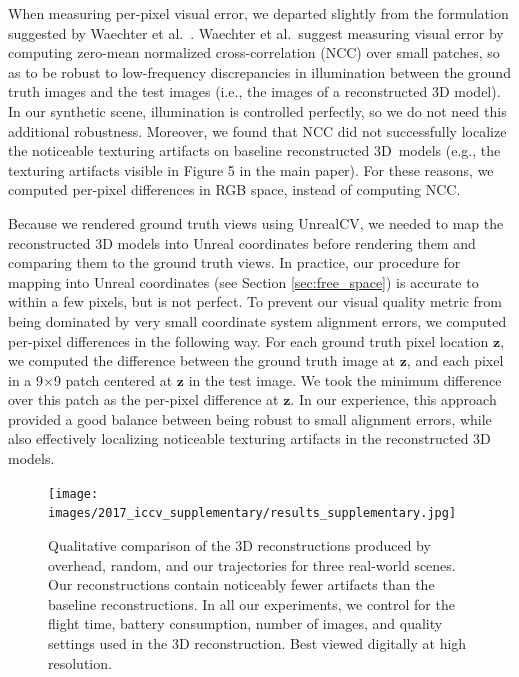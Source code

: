 When measuring per-pixel visual error, we departed slightly from the formulation suggested by Waechter et al.~\cite{waechter:2017}.
Waechter et al.~suggest measuring visual error by computing zero-mean normalized cross-correlation (NCC) over small patches, so as to be robust to low-frequency discrepancies in illumination between the ground truth images and the test images (i.e., the images of a reconstructed 3D model).
In our synthetic scene, illumination is controlled perfectly, so we do not need this additional robustness.
Moreover, we found that NCC did not successfully localize the noticeable texturing artifacts on baseline reconstructed 3D\ models (e.g., the texturing artifacts visible in Figure 5 in the main paper).
For these reasons, we computed per-pixel differences in RGB space, instead of computing NCC.

Because we rendered ground truth views using UnrealCV, we needed to map the reconstructed 3D models into Unreal coordinates before rendering them and comparing them to the ground truth views.
In practice, our procedure for mapping into Unreal coordinates (see Section \ref{sec:free_space}) is accurate to within a few pixels, but is not perfect.
To prevent our visual quality metric from being dominated by very small coordinate system alignment errors, we computed per-pixel differences in the following way.
For each ground truth pixel location $\mathbf{z}$, we computed the difference between the ground truth image at $\mathbf{z}$, and each pixel in a 9$\times$9 patch centered at $\mathbf{z}$ in the test image.
We took the minimum difference over this patch as the per-pixel difference at $\mathbf{z}$.
In our experience, this approach provided a good balance between being robust to small alignment errors, while also effectively localizing noticeable texturing artifacts in the reconstructed 3D models.

\begin{figure}[t]
\begin{center}
\texttt{[image: images/2017\_iccv\_supplementary/results\_supplementary.jpg]}
\end{center}
\caption{
Qualitative comparison of the 3D reconstructions produced by overhead, random, and our trajectories for three real-world scenes.
Our reconstructions contain noticeably fewer artifacts than the baseline reconstructions.
In all our experiments, we control for the flight time, battery consumption, number of images, and quality settings used in the 3D reconstruction.
Best viewed digitally at high resolution.
\vspace{-6pt}
}
\label{fig:results_supplementary}
\end{figure}


